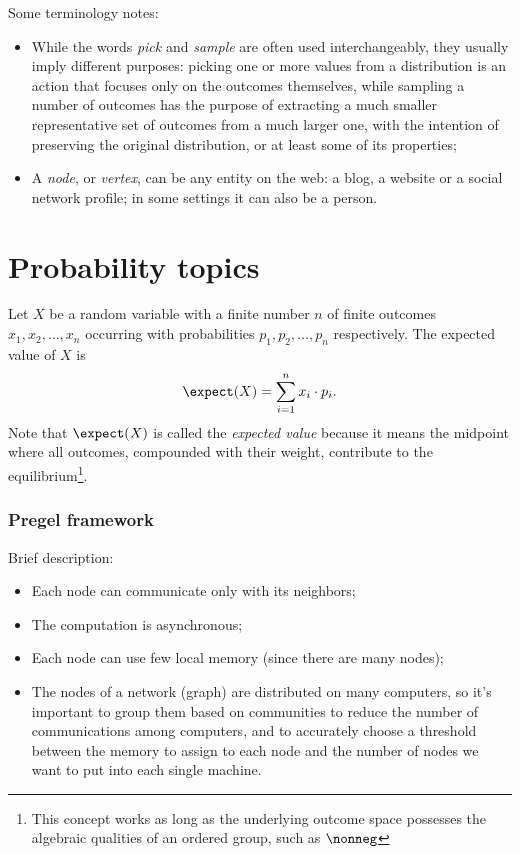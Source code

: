 Some terminology notes:

\begin{itemize}
    \item While the words \emph{pick} and \emph{sample} are often used interchangeably, they usually imply different purposes: picking one or more values from a distribution is an action that focuses only on the outcomes themselves, while sampling a number of outcomes has the purpose of extracting a much smaller representative set of outcomes from a much larger one, with the intention of preserving the original distribution, or at least some of its properties;
    \item A \emph{node}, or \emph{vertex}, can be any entity on the web: a blog, a website or a social network profile; in some settings it can also be a person.
\end{itemize}


\section{Probability topics}
    
\begin{defn}\label{def:expected-value}
    Let $X$ be a random variable with a finite number $n$ of finite outcomes $x_1, x_2, \ldots, x_n$ occurring with probabilities $p_1, p_2, \ldots, p_n$ respectively. The expected value of $X$ is
    \begin{equation}
        \expect(X) = \sum_{i = 1}^{n} x_i \cdot p_i.
    \end{equation}
    Note that $\expect(X)$ is called the \textit{expected value} because it means the midpoint where all outcomes, compounded with their weight, contribute to the equilibrium\footnote{This concept works as long as the underlying outcome space possesses the algebraic qualities of an ordered group, such as $\nonneg$}.
\end{defn}


\subsubsection{Pregel framework}

Brief description:
\begin{itemize}
    \item Each node can communicate only with its neighbors;
    \item The computation is asynchronous;
    \item Each node can use few local memory (since there are many nodes);
    \item The nodes of a network (graph) are distributed on many computers, so it's important to group them based on communities to reduce the number of communications among computers, and to accurately choose a threshold between the memory to assign to each node and the number of nodes we want to put into each single machine.
\end{itemize}

